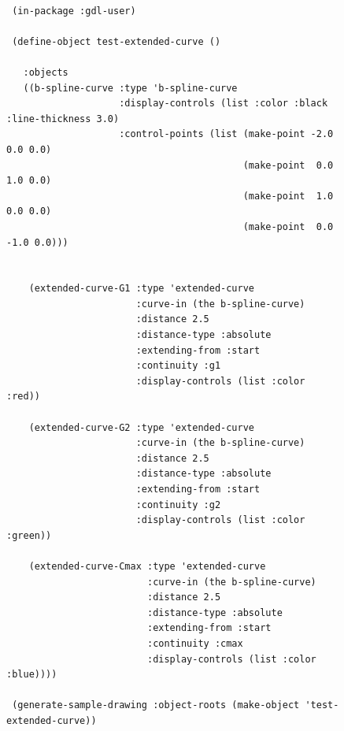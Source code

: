\documentclass [11pt]{book}
\begin{document}
\begin{itemize}
\begin{description}
\end{description}




\begin{figure}
\begin{lrbox}{\boxedverb}
\begin{minipage}{\linewidth}
{\small

\begin{verbatim}
  
 (in-package :gdl-user)

 (define-object test-extended-curve ()

   :objects
   ((b-spline-curve :type 'b-spline-curve
                    :display-controls (list :color :black :line-thickness 3.0)
                    :control-points (list (make-point -2.0 0.0 0.0)
                                          (make-point  0.0 1.0 0.0) 
                                          (make-point  1.0 0.0 0.0) 
                                          (make-point  0.0 -1.0 0.0))) 
                                           
    
    (extended-curve-G1 :type 'extended-curve
                       :curve-in (the b-spline-curve)
                       :distance 2.5
                       :distance-type :absolute
                       :extending-from :start
                       :continuity :g1
                       :display-controls (list :color :red))
    
    (extended-curve-G2 :type 'extended-curve
                       :curve-in (the b-spline-curve)
                       :distance 2.5
                       :distance-type :absolute
                       :extending-from :start
                       :continuity :g2
                       :display-controls (list :color :green))
    
    (extended-curve-Cmax :type 'extended-curve
                         :curve-in (the b-spline-curve)
                         :distance 2.5
                         :distance-type :absolute
                         :extending-from :start
                         :continuity :cmax
                         :display-controls (list :color :blue))))

 (generate-sample-drawing :object-roots (make-object 'test-extended-curve))

   
\end{verbatim}}
\end{minipage}
\end{lrbox}
\fbox{\usebox{\boxedverb}}


\end{figure}
\end{itemize}
\end{document}
